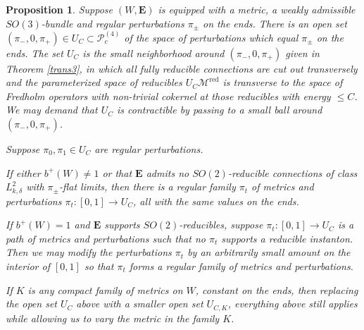 \documentclass{memo-l}
\newtheorem{proposition}[theorem]{Proposition}
\theoremstyle{definition}
\theoremstyle{remark}
\numberwithin{section}{chapter}
\numberwithin{equation}{chapter}
\begin{document}
\begin{proposition}\label{famtrans}Suppose $(W,\mathbf{E})$ is equipped with a metric, a weakly admissible $SO(3)$-bundle and regular perturbations $\pi_\pm$ on the ends. There is an open set $(\pi_-, 0, \pi_+) \in U_C \subset \mathcal P^{(4)}_c$ of the space of perturbations which equal $\pi_\pm$ on the ends. The set $U_C$ is the small neighborhood around $(\pi_-, 0, \pi_+)$ given in Theorem \ref{trans3}, in which all fully reducible connections are cut out transversely and the parameterized space of reducibles $U_C \mathcal M^{\text{red}}$ is transverse to the space of Fredholm operators with non-trivial cokernel at those reducibles with energy $\leq C$. We may demand that $U_C$ is contractible by passing to a small ball around $(\pi_-, 0, \pi_+)$.

Suppose $\pi_0, \pi_1 \in U_C$ are regular perturbations.

If either $b^+(W) \neq 1$ or that $\mathbf{E}$ admits no $SO(2)$-reducible connections of class $L^2_{k,\delta}$ with $\pi_\pm$-flat limits, then there is a regular family $\pi_t$ of metrics and perturbations $\pi_t: [0,1] \to U_C$, all with the same values on the ends.

If $b^+(W) = 1$ and $\mathbf{E}$ supports $SO(2)$-reducibles, suppose $\pi_t: [0,1] \to U_C$ is a path of metrics and perturbations such that no $\pi_t$ supports a reducible instanton. Then we may modify the perturbations $\pi_t$ by an arbitrarily small amount on the interior of $[0,1]$ so that $\pi_t$ forms a regular family of metrics and perturbations.

If $K$ is any compact family of metrics on $W$, constant on the ends, then replacing the open set $U_C$ above with a smaller open set $U_{C,K}$, everything above still applies while allowing us to vary the metric in the family $K$.
\end{proposition}
\end{document}
